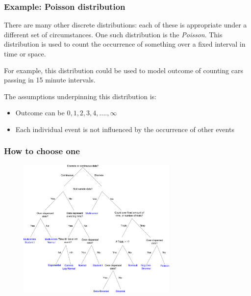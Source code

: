 \documentclass{beamer}
\begin{document}
		\begin{frame}
			\frametitle{Example: Poisson distribution}
			
			There are many other discrete distributions: each of these is appropriate under a different set of circumstances. One such distribution is the \textit{Poisson}. This distribution is used to count the occurrence of something over a fixed interval in time or space.
			
			\vspace{0.5cm}
			
			For example, this distribution could be used to model outcome of counting cars passing in 15 minute intervals.
			
			\vspace{0.5cm}
			
			The assumptions underpinning this distribution is:
			
			\begin{itemize}
				\item Outcome can be $0, 1, 2, 3, 4, ...., \infty$
				\item Each individual event is not influenced by the occurrence of other events
			\end{itemize}
			
		\end{frame}
	
	\begin{frame}
		\frametitle{How to choose one}
		
		\begin{figure}[h]
			\centerline{\includegraphics[width=0.7\textwidth]{figures/Distributions_likelihoodTree.pdf}}
		\end{figure}
		
	\end{frame}
	
\end{document}
